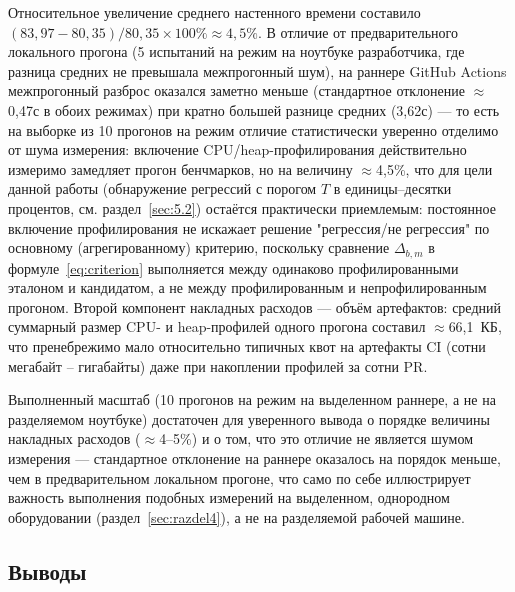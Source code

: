 Относительное увеличение среднего настенного времени составило
$(83{,}97 - 80{,}35)/80{,}35 \times 100\% \approx 4{,}5\%$. В отличие от
предварительного локального прогона (5 испытаний на режим на ноутбуке
разработчика, где разница средних не превышала межпрогонный шум), на
раннере GitHub Actions межпрогонный разброс оказался заметно меньше
(стандартное отклонение $\approx$0,47с в обоих режимах) при кратно большей
разнице средних (3,62с) — то есть на выборке из 10 прогонов на режим
отличие статистически уверенно отделимо от шума измерения: включение
CPU/heap-профилирования действительно измеримо замедляет прогон
бенчмарков, но на величину $\approx$4,5\%, что для цели данной работы
(обнаружение регрессий с порогом $T$ в единицы--десятки процентов, см.
раздел~\ref{sec:5.2}) остаётся практически приемлемым: постоянное
включение профилирования не искажает решение "регрессия/не регрессия" по
основному (агрегированному) критерию, поскольку сравнение
$\Delta_{b,m}$ в формуле~\eqref{eq:criterion} выполняется между
одинаково профилированными эталоном и кандидатом, а не между
профилированным и непрофилированным прогоном. Второй компонент накладных
расходов — объём артефактов: средний суммарный размер CPU- и
heap-профилей одного прогона составил $\approx$66,1~КБ, что
пренебрежимо мало относительно типичных квот на артефакты CI (сотни
мегабайт -- гигабайты) даже при накоплении профилей за сотни PR.

Выполненный масштаб (10 прогонов на режим на выделенном раннере, а не на
разделяемом ноутбуке) достаточен для уверенного вывода о порядке величины
накладных расходов ($\approx$4--5\%) и о том, что это отличие не является
шумом измерения — стандартное отклонение на раннере оказалось на порядок
меньше, чем в предварительном локальном прогоне, что само по себе
иллюстрирует важность выполнения подобных измерений на выделенном,
однородном оборудовании (раздел~\ref{sec:razdel4}), а не на разделяемой
рабочей машине.

\subsection{Выводы}
\label{sec:5.4}

